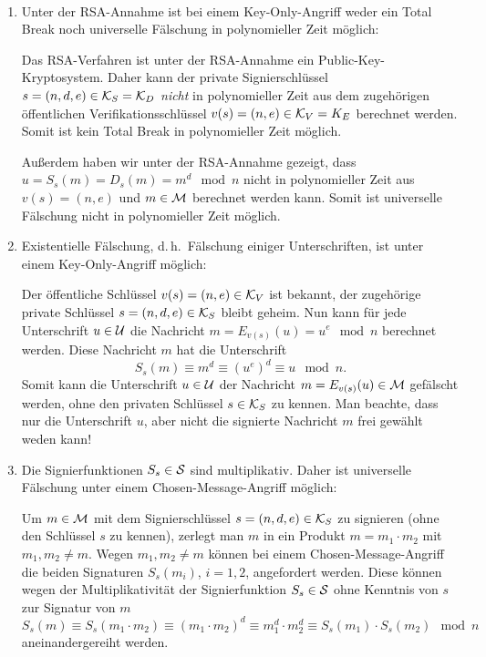 \begin{remark}{\ }\label{rem:rsasignature}
 \begin{enumerate}
  \item Unter der RSA-Annahme ist bei einem Key-Only-Angriff weder ein Total Break noch universelle Fälschung in polynomieller Zeit möglich:

  Das RSA-Verfahren ist unter der RSA-Annahme ein Public-Key-Kryptosystem. Daher kann der private Signierschlüssel $s = (n, d,e) \in \mathcal K_S = \mathcal K_D$ \emph{nicht} in polynomieller Zeit aus dem zugehörigen öffentlichen Verifikationsschlüssel $v(s) = (n, e) \in \mathcal K_V = K_E$ berechnet werden. Somit ist kein Total Break in polynomieller Zeit möglich.
  
  Außerdem haben wir unter der RSA-Annahme gezeigt, dass $u = S_s(m) = D_s(m) = m^d \mod n$ nicht in polynomieller Zeit aus $v(s) = (n, e)$ und $m \in \mathcal M$ berechnet werden kann. Somit ist universelle Fälschung nicht in polynomieller Zeit möglich.
  
  \item Existentielle Fälschung, d.\,h.~Fälschung einiger Unterschriften, ist unter einem Key-Only-Angriff möglich: 
  
  Der öffentliche Schlüssel $v(s) = (n, e) \in \mathcal K_V$ ist bekannt, der zugehörige private Schlüssel $s = (n, d, e) \in \mathcal K_S$ bleibt geheim. Nun kann für jede Unterschrift $u \in \mathcal U$ die Nachricht $m = E_{v(s)}(u) = u^e \mod n$ berechnet werden. Diese Nachricht $m$ hat die Unterschrift 
  \[S_s(m) \equiv m^d \equiv (u^e)^d \equiv u \mod n.\]
  Somit kann die Unterschrift $u \in \mathcal U$ der Nachricht $m = E_{v(s)}(u) \in \mathcal M$ gefälscht werden, ohne den privaten Schlüssel $s \in \mathcal K_S$ zu kennen. Man beachte, dass nur die Unterschrift $u$, aber nicht die signierte Nachricht $m$ frei gewählt weden kann!
  
  \item Die Signierfunktionen $S_s \in \mathcal S$ sind multiplikativ. Daher ist universelle Fälschung unter einem Chosen-Message-Angriff möglich: 
  
  Um $m \in \mathcal M$ mit dem Signierschlüssel $s = (n, d, e) \in \mathcal K_S$ zu signieren (ohne den Schlüssel $s$ zu kennen), zerlegt man $m$ in ein Produkt $m = m_1 \cdot m_2$ mit $m_1, m_2 ≠ m$. Wegen $m_1, m_2 ≠ m$ können bei einem Chosen-Message-Angriff die beiden Signaturen $S_s(m_i)$, $i = 1, 2$, angefordert werden. Diese können wegen der Multiplikativität der Signierfunktion $S_s \in \mathcal S$ ohne Kenntnis von $s$ zur Signatur von $m$
  \[S_s(m) \equiv S_s(m_1⋅ m_2) \equiv (m_1 \cdot m_2)^d \equiv m_1^d \cdot m_2^d \equiv S_s(m_1) \cdot S_s(m_2) \mod n\]
  aneinandergereiht werden. 
 \end{enumerate}
\end{remark}



